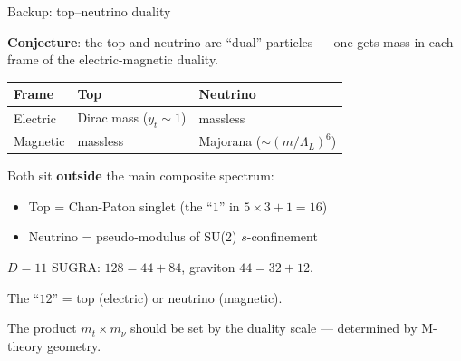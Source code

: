 \documentclass[aspectratio=169,12pt]{beamer}
\begin{document}
\begin{frame}{Backup: top--neutrino duality}

\textbf{Conjecture}: the top and neutrino are ``dual'' particles ---
one gets mass in each frame of the electric-magnetic duality.

\bigskip
\begin{center}
\begin{tabular}{lll}
\toprule
Frame & Top & Neutrino \\
\midrule
Electric & Dirac mass ($y_t \sim 1$) & massless \\
Magnetic & massless & Majorana ($\sim (m/\Lambda_L)^6$) \\
\bottomrule
\end{tabular}
\end{center}

\bigskip
Both sit \textbf{outside} the main composite spectrum:
\begin{itemize}
\item Top = Chan-Paton singlet (the ``$1$'' in $5\times 3 + 1 = 16$)
\item Neutrino = pseudo-modulus of SU(2) $s$-confinement
\end{itemize}

\medskip
$D{=}11$ SUGRA: $128 = 44 + 84$, graviton $44 = 32 + 12$.

The ``$12$'' = top (electric) or neutrino (magnetic).

\medskip
The product $m_t \times m_\nu$ should be set by the duality
scale --- determined by M-theory geometry.

\end{frame}
\end{document}
